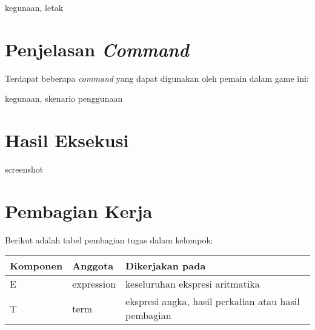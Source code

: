 \documentclass[a4paper,titlepage]{article}
\begin{document}
		kegunaan, letak


	\section{Penjelasan \textit{Command}}

		\noindent Terdapat beberapa \textit{command} yang dapat digunakan oleh pemain dalam game ini:

		kegunaan, skenario penggunaan

	\section{Hasil Eksekusi}

		screenshot


	\section{Pembagian Kerja}

		\noindent Berikut adalah tabel pembagian tugas dalam kelompok:

		\begin{table}[H]
			\centering
			\begin{tabular}{@{}lll@{}}
				\toprule
				Komponen & Anggota & Dikerjakan pada \\ \midrule
				E & expression 			& keseluruhan ekspresi aritmatika \\
				T & term 				& ekspresi angka, hasil perkalian atau hasil pembagian \\

			\end{tabular}
		\end{table}
\end{document}
